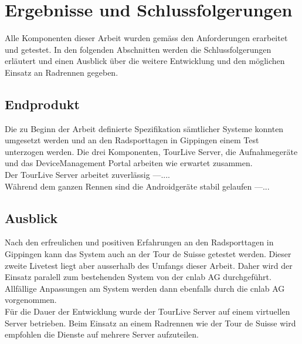 \chapter{Ergebnisse und Schlussfolgerungen}

Alle Komponenten dieser Arbeit wurden gemäss den Anforderungen erarbeitet und getestet. In den folgenden Abschnitten werden die Schlussfolgerungen erläutert und einen Ausblick über die weitere Entwicklung und den möglichen Einsatz an Radrennen gegeben.

\section{Endprodukt}
Die zu Beginn der Arbeit definierte Spezifikation sämtlicher Systeme konnten umgesetzt werden und an den Radsporttagen in Gippingen einem Test unterzogen werden. Die drei Komponenten, TourLive Server, die Aufnahmegeräte und das DeviceManagement Portal arbeiten wie erwartet zusammen.
\\

Der TourLive Server arbeitet zuverlässig ---....
\\

Während dem ganzen Rennen sind die Androidgeräte stabil gelaufen ---...
\\

\section{Ausblick}
Nach den erfreulichen und positiven Erfahrungen an den Radsporttagen in Gippingen kann das System auch an der Tour de Suisse getestet werden. Dieser zweite Livetest liegt aber ausserhalb des Umfangs dieser Arbeit. Daher wird der Einsatz paralell zum bestehenden System von der cnlab AG durchgeführt. Allfällige Anpassungen am System werden dann ebenfalls durch die cnlab AG vorgenommen.
\\

Für die Dauer der Entwicklung wurde der TourLive Server auf einem virtuellen Server betrieben. Beim Einsatz an einem Radrennen wie der Tour de Suisse wird empfohlen die Dienste auf mehrere Server aufzuteilen.
